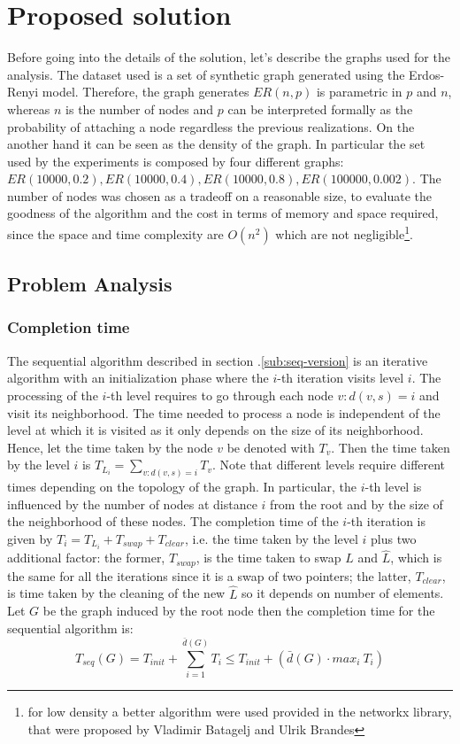 \section{Proposed solution}
Before going into the details of the solution, let's describe the graphs 
used for the analysis. The dataset used is a set of synthetic 
graph generated using the Erdos-Renyi model.
Therefore, the graph generates $ER(n, p)$ is parametric in $p$ and $n$, whereas $n$ is the number of nodes and $p$ can be interpreted formally as the probability
of attaching a node regardless the previous realizations.  On the another hand it
can be seen as the density of the graph. In particular the set used by the experiments
is composed by four different graphs: $ER(10000, 0.2), ER(10000, 0.4), ER(10000, 0.8), ER(100000, 0.002)$. 
The number of nodes was chosen as a tradeoff on a reasonable size, to evaluate the
goodness of the algorithm and the cost in terms of memory and space required, since
the space and time complexity are $O(n^2)$ which are not negligible\footnote{for low density a better algorithm were used provided in the networkx library, that were proposed by Vladimir Batagelj and Ulrik Brandes\cite{PhysRevE.71.036113}}.
\subsection{Problem Analysis}
\subsubsection{Completion time}
\label{sec:comp-time}
The sequential algorithm described in section .\ref{sub:seq-version} is an
iterative algorithm with an initialization phase where the $i$-th iteration visits level $i$. The
processing of the $i$-th level requires to go through each node
$v : d(v, s) = i$ and visit its neighborhood.
The time needed to process a node is independent of the
level at which it is visited as it only depends on the size
of its neighborhood. Hence, let the time taken by the node $v$ be denoted 
with $T_v$. Then the time taken by the level $i$ is $T_{L_i} = \sum_{v : d(v, s) = i}T_v$.
Note that different levels require different times depending on the topology of the graph. In particular, the $i$-th level is influenced by the number of nodes at distance $i$ from the root 
and by the size of the neighborhood of these nodes. The completion time of the $i$-th
iteration is given by $T_i = T_{L_i} + T_{swap} + T_{clear}$, i.e. the time taken by the level $i$ plus two additional factor: the former, $T_{swap}$, is the time taken to swap 
$L$ and $\hat{L}$, which is the same for all the iterations since it is a swap of two pointers; the latter, $T_{clear}$, is
time taken by the cleaning of the new $\hat{L}$ so it depends on number of elements.
Let $G$ be the graph induced by the root node then the completion time for the sequential algorithm is:
$$
T_{seq}(G) = T_{init} + \sum^{\bar{d}(G)}_{i=1} T_i \leq  T_{init} + (\bar{d}(G) \cdot max_i \ T_i)
$$

